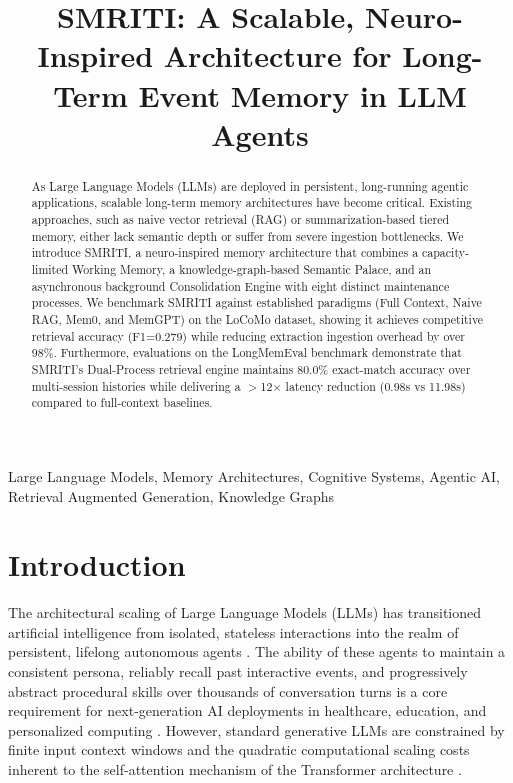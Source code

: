 \documentclass[conference]{IEEEtran}
\begin{document}
\title{SMRITI: A Scalable, Neuro-Inspired Architecture for Long-Term Event Memory in LLM Agents}

\author{
}

\maketitle

\begin{abstract}
As Large Language Models (LLMs) are deployed in persistent, long-running agentic applications, scalable long-term memory architectures have become critical. Existing approaches, such as naive vector retrieval (RAG) or summarization-based tiered memory, either lack semantic depth or suffer from severe ingestion bottlenecks. We introduce SMRITI, a neuro-inspired memory architecture that combines a capacity-limited Working Memory, a knowledge-graph-based Semantic Palace, and an asynchronous background Consolidation Engine with eight distinct maintenance processes. We benchmark SMRITI against established paradigms (Full Context, Naive RAG, Mem0, and MemGPT) on the LoCoMo dataset, showing it achieves competitive retrieval accuracy (F1=0.279) while reducing extraction ingestion overhead by over 98\%. Furthermore, evaluations on the LongMemEval benchmark demonstrate that SMRITI's Dual-Process retrieval engine maintains 80.0\% exact-match accuracy over multi-session histories while delivering a $>$12$\times$ latency reduction (0.98s vs 11.98s) compared to full-context baselines.
\end{abstract}

\begin{IEEEkeywords}
Large Language Models, Memory Architectures, Cognitive Systems, Agentic AI, Retrieval Augmented Generation, Knowledge Graphs
\end{IEEEkeywords}

\section{Introduction}

The architectural scaling of Large Language Models (LLMs) has transitioned artificial intelligence from isolated, stateless interactions into the realm of persistent, lifelong autonomous agents \cite{brown2020language, xi2023rise}. The ability of these agents to maintain a consistent persona, reliably recall past interactive events, and progressively abstract procedural skills over thousands of conversation turns is a core requirement for next-generation AI deployments in healthcare, education, and personalized computing \cite{wang2023survey}. However, standard generative LLMs are constrained by finite input context windows and the quadratic computational scaling costs inherent to the self-attention mechanism of the Transformer architecture \cite{vaswani2017attention}.
\end{document}
